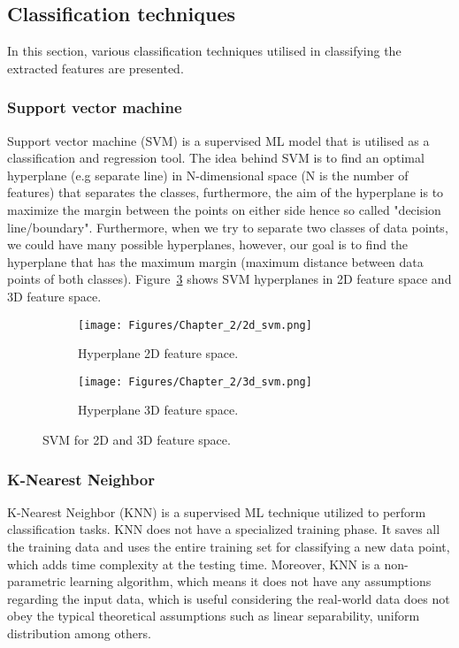\subsection{Classification techniques}
In this section, various classification techniques utilised in classifying the extracted features are presented.
\subsubsection{Support vector machine}
Support vector machine (SVM) is a supervised ML model that is utilised as a classifica\-tion and regression tool.  
The idea behind SVM is to find an optimal hyperplane (e.g separate line) in N-dimensional space (N is the number of features) that separates the classes, furthermore, the aim of the hyperplane is to maximize the margin between the points on either side hence so called "decision line/boundary".
Furthermore, when we try to separate two classes of data points, we could have many possible hyperplanes, however, our goal is to find the hyperplane that has the maximum margin (maximum distance between data points of both classes). 
Figure~\ref{fig:SVM} shows SVM hyperplanes in 2D feature space and 3D feature space.
\begin{figure}[!ht]
	\centering
	\begin{subfigure}[b]{0.40\textwidth}		
		\texttt{[image: Figures/Chapter\_2/2d\_svm.png]}
		\caption{Hyperplane 2D feature space.}
		\label{fig:2dsvm}
	\end{subfigure}
	\begin{subfigure}[b]{0.49\textwidth}
		\texttt{[image: Figures/Chapter\_2/3d\_svm.png]}
		\caption{Hyperplane 3D feature space.} 
		\label{fig:3dsvm}
	\end{subfigure}	
	\caption{SVM for 2D and 3D feature space.}
	\label{fig:SVM}
\end{figure}
\subsubsection{K-Nearest Neighbor}
K-Nearest Neighbor (KNN) is a supervised ML technique utilized to perform classifica\-tion tasks.
KNN does not have a specialized training phase.
It saves all the training data and uses the entire training set for classifying a new data point, which adds time complexity at the testing time.
Moreover, KNN is a non-parametric learning algorithm, which means it does not have any assumptions regarding the input data, which is useful considering the real-world data does not obey the typical theoretical assumptions such as linear separability, uniform distribution among others.

